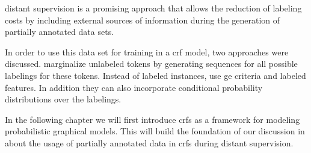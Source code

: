 \Gls{distant supervision} is a promising approach that allows the reduction of labeling costs by including external sources of information during the generation of partially annotated data sets.

In order to use this data set for training in a \gls{crf} model, two approaches were discussed.
\citet{tsuboi2008training} marginalize unlabeled tokens by generating sequences for all possible labelings for these tokens.
Instead of labeled instances, \citet{mann2008generalized} use \gls{ge} criteria and labeled features.
In addition they can also incorporate \glspl{conditional probability distribution} over the labelings.

In the following chapter we will first introduce \glspl{crf} as a framework for modeling \glspl{probabilistic graphical model}.
This will build the foundation of our discussion in  about the usage of partially annotated data in \glspl{crf} during \gls{distant supervision}.

